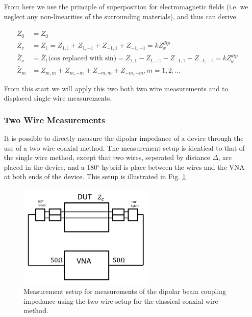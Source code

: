 \documentclass[12pt,a4paper,twopage,openright]{article}
\begin{document}
From here we use the principle of superposition for electromagnetic fields (i.e. we neglect any non-linearities of the surrounding materials), and thus can derive

\begin{align}
\bar{Z}_{0} &= Z_{0} \\
\bar{Z}_{x} &= \bar{Z}_{1} = Z_{1,1} + Z_{1,-1} + Z_{-1,1} + Z_{-1,-1} = kZ^{dip}_{x}\\
\bar{Z}_{x} &= \bar{Z}_{1} \text{(cos replaced with sin)}= Z_{1,1} - Z_{1,-1} - Z_{-1,1} + Z_{-1,-1} = kZ^{dip}_{y}\\
\bar{Z}_{m} &= Z_{m,m} + Z_{m,-m} + Z_{-m,m} + Z_{-m,-m}, m=1,2,...
\end{align}

From this start we will apply this two both two wire measurements and to displaced single wire measurements.

\subsubsection{Two Wire Measurements}

It is possible to directly measure the dipolar impedance of a device through the use of a two wire coaxial method. The measurement setup is identical to that of the single wire method, except that two wires, seperated by distance $\Delta$, are placed in the device, and a 180$^{\circ}$ hybrid is place between the wires and the VNA at both ends of the device. This setup is illustrated in Fig. \ref{fig:two_wire_measure}

\begin{figure}
\begin{center}
\includegraphics[width=0.6\textwidth]{figures/wire_meas_two_wire.pdf}
\end{center}
\label{fig:two_wire_measure}
\caption{Measurement setup for measurements of the dipolar beam coupling impedance using the two wire setup for the classical coaxial wire method.}
\end{figure}
\end{document}

